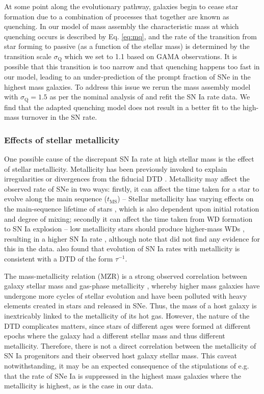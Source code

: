 \documentclass[fleqn,usenatbib]{mnras}
\begin{document}
At some point along the evolutionary pathway, galaxies begin to cease star formation due to a combination of processes that together are known as quenching. In our model of mass assembly the characteristic mass at which quenching occurs is described by Eq. \ref{eq:mq}, and the rate of the transition from star forming to passive (as a function of the stellar mass) is determined by the transition scale $\sigma_{\mathrm{Q}}$ which we set to 1.1 based on GAMA observations. It is possible that this transition is too narrow and that quenching happens too fast in our model, leading to an under-prediction of the prompt fraction of SNe in the highest mass galaxies. To address this issue we rerun the mass assembly model with $\sigma_{\mathrm{Q}} = 1.5$ as per the nominal analysis of  and refit the SN Ia rate data. We find that the adapted quenching model does not result in a better fit to the high-mass turnover in the SN rate.

\subsubsection{Effects of stellar metallicity}

One possible cause of the discrepant SN Ia rate at high stellar mass is the effect of stellar metallicity. Metallicity has been previously invoked to explain irregularities or divergences from the fiducial DTD \citep[e.g.][]{Strolger2010,Meng2011,Kistler2013}. Metallicity may affect the observed rate of SNe in two ways: firstly, it can affect the time taken for a star to evolve along the main sequence ($t_{\mathrm{MS}}$) -- Stellar metallicity has varying effects on the main-sequence lifetime of stars \citep[e.g.][]{Georgy2013,Amard2020}, which is also dependent upon initial rotation and degree of mixing; secondly it can affect the time taken from WD formation to SN Ia explosion -- low metallicity stars should produce higher-mass WDs \citep[e.g.][]{Umeda1999,Marigo2007}, resulting in a higher SN Ia rate \citep{Kistler2013}, although note that \citet{Kistler2013} did not find any evidence for this in the data. \citet{Graur2017a} also found that evolution of SN Ia rates with metallicity is consistent with a DTD of the form  $\tau^{-1}$.

The mass-metallicity relation (MZR) is a strong observed correlation between galaxy stellar mass and gas-phase metallicity \citep[e.g.][]{Tremonti2004}, whereby higher mass galaxies have undergone more cycles of stellar evolution and have been polluted with heavy elements created in stars and released in SNe. Thus, the mass of a host galaxy is inextricably linked to the metallicity of its hot gas. However, the nature of the DTD complicates matters, since stars of different ages were formed at different epochs where the galaxy had a different stellar mass and thus different metallicity. Therefore, there is not a direct correlation between the metallicity of SN Ia progenitors and their observed host galaxy stellar mass.  This caveat notwithstanding, it may be an expected consequence of the stipulations of e.g. \citet{Kistler2013} that the rate of SNe Ia is suppressed in the highest mass galaxies where the metallicity is highest, as is the case in our data.
\end{document}
